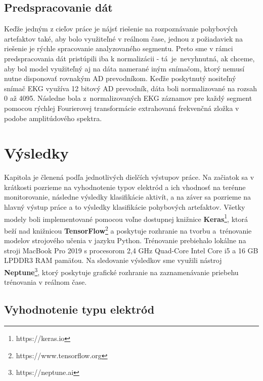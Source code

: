 \section{Predspracovanie dát}

Keďže jedným z cieľov práce je nájsť riešenie na rozpoznávanie pohybových artefaktov také, aby bolo využiteľné v reálnom čase, jednou z požiadaviek na riešenie je rýchle spracovanie analyzovaného segmentu. Preto sme v rámci predspracovania dát pristúpili iba k normalizácii - tá~je~nevyhnutná, ak chceme, aby bol model využiteľný aj na dáta namerané iným snímačom, ktorý nemusí nutne disponovať rovnakým AD prevodníkom. Keďže poskytnutý nositeľný snímač EKG využíva 12 bitový AD prevodník, dáta boli normalizované na rozsah 0 až 4095. Následne bola z~normalizovaných EKG záznamov pre každý segment pomocou rýchlej Fourierovej transformácie extrahovaná frekvenčná zložka v podobe amplitúdového spektra.


\chapter{Výsledky}

Kapitola je členená podľa jednotlivých dielčích výstupov práce. Na začiatok sa v krátkosti pozrieme na vyhodnotenie typov elektród a ich vhodnosť na terénne monitorovanie, následne výsledky klasifikácie aktivít, a na záver sa pozrieme na hlavný výstup práce a to výsledky klasifikácie pohybových artefaktov. Všetky modely boli implementované pomocou voľne dostupnej knižnice \textbf{Keras}\footnote{https://keras.io}, ktorá beží nad knižnicou \textbf{TensorFlow}\footnote{https://www.tensorflow.org} a poskytuje rozhranie na tvorbu a~trénovanie modelov strojového učenia v jazyku Python. Trénovanie prebiehalo lokálne na stroji MacBook Pro 2019 s procesorom 2,4 GHz Quad-Core Intel Core i5 a 16 GB LPDDR3 RAM pamäťou. Na sledovanie výsledkov sme využili nástroj \textbf{Neptune}\footnote{https://neptune.ai}, ktorý poskytuje grafické rozhranie na zaznamenávanie priebehu trénovania v reálnom čase.

\section{Vyhodnotenie typu elektród}

